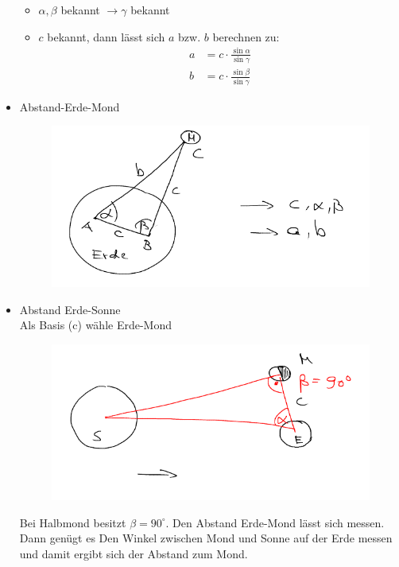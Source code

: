 \begin{Beispiel}
\begin{itemize}
 \begin{itemize}
  \item $\alpha, \beta$ bekannt $\to \gamma$ bekannt
  \item $c$ bekannt, dann lässt sich $a$ bzw. $b$ berechnen zu:
\begin{align*}
a&=c\cdot \frac{\sin \alpha}{\sin \gamma}\\
b&=c\cdot \frac{\sin \beta}{\sin \gamma}
\end{align*}
 \end{itemize}
\newpage
\item Abstand-Erde-Mond \\
 \begin{figure}[!h]
  \includegraphics[scale=0.5]{bilder/fig8}
 \end{figure}

\item Abstand Erde-Sonne\\
 Als Basis (c) wähle Erde-Mond
 \begin{figure}[!h]
  \includegraphics[scale=0.5]{bilder/fig9}
 \end{figure}
 Bei Halbmond besitzt $\beta=90^\circ$.  Den Abstand Erde-Mond lässt sich messen. Dann genügt es Den Winkel zwischen Mond und Sonne auf der Erde messen und damit ergibt sich der Abstand zum Mond.


\end{itemize}
\end{Beispiel}
